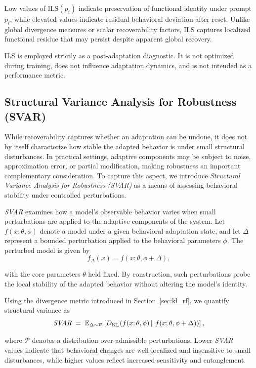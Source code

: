 \documentclass[10pt]{article}
\begin{document}
	Low values of $\mathrm{ILS}(p_i)$ indicate preservation of functional identity under prompt $p_i$, while elevated values indicate residual behavioral deviation after reset. Unlike global divergence measures or scalar recoverability factors, ILS captures localized functional residue that may persist despite apparent global recovery.
	
	ILS is employed strictly as a post-adaptation diagnostic. It is not optimized during training, does not influence adaptation dynamics, and is not intended as a performance metric.
	
	\subsection{Structural Variance Analysis for Robustness (SVAR)}
	\label{sec:svar}
	
	While recoverability captures whether an adaptation can be undone, it does not by itself characterize how stable the adapted behavior is under small structural disturbances. In practical settings, adaptive components may be subject to noise, approximation error, or partial modification, making robustness an important complementary consideration. To capture this aspect, we introduce \emph{Structural Variance Analysis for Robustness} \emph{(SVAR)} as a means of assessing behavioral stability under controlled perturbations.
	
	\emph{SVAR} examines how a model’s observable behavior varies when small perturbations are applied to the adaptive components of the system. Let $f(x;\theta,\phi)$ denote a model under a given behavioral adaptation state, and let $\Delta$ represent a bounded perturbation applied to the behavioral parameters $\phi$. The perturbed model is given by
	\[
	f_\Delta(x) = f(x;\theta,\phi + \Delta),
	\]
	
	with the core parameters $\theta$ held fixed. By construction, such perturbations probe the local stability of the adapted behavior without altering the model’s identity.
	
	Using the divergence metric introduced in Section~\ref{sec:kl_rf}, we quantify structural variance as
	\[
	\mathrm{\emph{SVAR}}
	\;=\;
	\mathbb{E}_{\Delta \sim \mathcal{P}}
	\left[
	D_{\mathrm{KL}}\!\left(f(x;\theta,\phi) \,\|\, f(x;\theta,\phi + \Delta)\right)
	\right],
	\]
	
	where $\mathcal{P}$ denotes a distribution over admissible perturbations. Lower \emph{SVAR} values indicate that behavioral changes are well-localized and insensitive to small disturbances, while higher values reflect increased sensitivity and entanglement.
	
\end{document}
